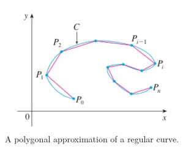 \documentclass[12pt,letterpaper,reqno]{article}
\numberwithin{equation}{section}
\begin{document}
{\begin{figure}[h]
	\begin{center}
	\includegraphics[scale=0.5]{figures_mvc/polygonal_approx}
\end{center}
\caption{A polygonal approximation of a regular curve.}
\end{figure}

}
\end{document}
